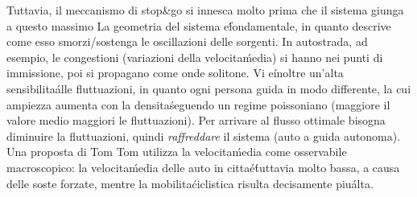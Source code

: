 \documentclass[12pt, a4paper]{book}
\theoremstyle{theorem}
\begin{document}
			Tuttavia, il meccanismo di stop\&go si innesca molto prima che il sistema giunga a questo massimo
			La geometria del sistema e\' fondamentale, in quanto descrive come esso smorzi/sostenga le oscillazioni delle sorgenti.
			In autostrada, ad esempio, le congestioni (variazioni della velocita\' media) si hanno nei punti di immissione, poi si propagano come onde solitone.
			Vi e\' inoltre un'alta sensibilita\' alle fluttuazioni, in quanto ogni persona guida in modo differente, la cui ampiezza aumenta con la densita\' seguendo un regime poissoniano (maggiore il valore medio maggiori le fluttuazioni).
			Per arrivare al flusso ottimale bisogna diminuire la fluttuazioni, quindi \emph{raffreddare} il sistema (auto a guida autonoma).\\
			Una proposta di Tom Tom utilizza la velocita\' media come osservabile macroscopico: la velocita\' media delle auto in citta\' e\' tuttavia molto bassa, a causa delle soste forzate, mentre la mobilita\' ciclistica risulta decisamente piu\' alta.
\end{document}

